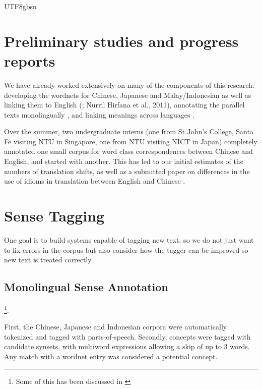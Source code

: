 \documentclass[12pt]{book} %
\begin{document}
\begin{CJK}{UTF8}{gbsn}




\section{Preliminary studies and progress reports}

We have already worked extensively on many of the components of this
research: developing the wordnets for Chinese, Japanese and Malay/Indonesian as
well as linking them to English
(\citealp{Isahara:Bond:Uchimoto:Utiyama:Kanzaki:2008,Bond:Isahara:Fujita:Uchimoto:Kuribayashi:Kanzaki:2009,Bond:Isahara:Kanzaki:Uchimoto:2008};  Nurril Hirfana et al., 2011)\nocite{Noor:Sapuan:Bond:2011},
annotating the parallel texts monolingually
\citep{Kuroda:Kuribayashi:Bond:Kanzaki:Uchimoto:2011,Tan:Bond:2011,Bond:Baldwin:Fothergill:Uchimoto:2012},
and linking meanings across languages
\citep{Bond:2010,Frermann:Bond:2012}.


Over the summer, two undergraduate interns (one from St John's
College, Santa Fe visiting NTU in Singapore, one from NTU visiting
NICT in Japan) completely annotated one small corpus for word class
correspondences between Chinese and English, and started with another.
This has led to our initial estimates of the numbers of translation
shifts, as well as a submitted paper on differences in the use of
idioms in translation between English and Chinese
\citep{Mok:2012,Kng:Bond:2012}.

\section{Sense Tagging}
\label{sec:sense-tagging}

One goal is to build systems capable of tagging new text: so we do not
just want to fix errors in the corpus but also consider how the tagger
can be improved so new text is treated correctly.


\subsection{Monolingual Sense Annotation}\footnote{Some of this has
  been discussed in \citet{Bond:Wang:Gao:Mok:Tan:2013}}.



First, the Chinese, Japanese and Indonesian corpora were automatically
tokenized and tagged with parts-of-speech.  Secondly, concepts were
tagged with candidate synsets, with multiword expressions allowing a
skip of up to 3 words.  Any match with a wordnet entry was considered
a potential concept.


\end{CJK}
\end{document}
